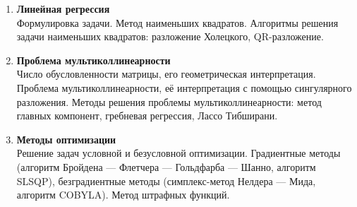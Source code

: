\documentclass[12pt,oneside,openany]{article}
\begin{document}
\begin{enumerate}
  \item \textbf{Линейная регрессия} \\
  Формулировка задачи. Метод наименьших квадратов. Алгоритмы решения задачи наименьших квадратов: разложение Холецкого, QR-разложение.

  \item \textbf{Проблема мультиколлинеарности} \\
  Число обусловленности матрицы, его геометрическая интерпретация. Проблема мультиколлинеарности, её интерпретация с помощью сингулярного разложения. Методы решения проблемы мультиколлинеарности: метод главных компонент, гребневая регрессия, Лассо Тибширани.

  \item \textbf{Методы оптимизации} \\
  Решение задач условной и безусловной оптимизации. Градиентные методы (алгоритм Бройдена --- Флетчера --- Гольдфарба --- Шанно, алгоритм SLSQP), безградиентные методы (симплекс-метод Нелдера --- Мида, алгоритм COBYLA). Метод штрафных функций.

\end{enumerate}
\end{document}

